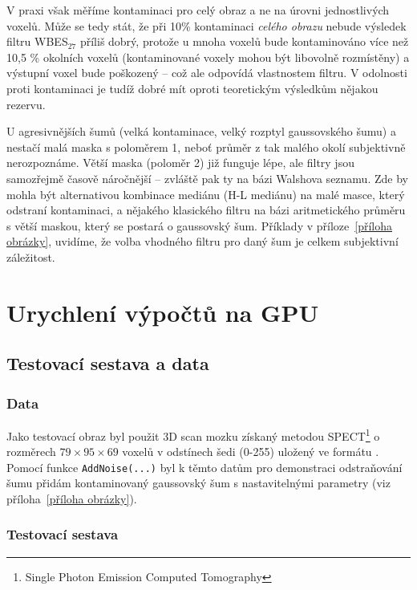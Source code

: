      \vspace{0.5cm}

     V praxi však měříme kontaminaci pro celý obraz a ne na úrovni jednostlivých voxelů. Může se tedy stát, že při 10\% kontaminaci \emph{celého obrazu} nebude výsledek filtru WBES$_{\mathrm{27}}$ příliš dobrý, protože u mnoha voxelů bude kontaminováno více než 10,5 \% okolních voxelů (kontaminované voxely mohou být libovolně rozmístěny) a výstupní voxel bude poškozený -- což ale odpovídá vlastnostem filtru. V odolnosti proti kontaminaci je tudíž dobré mít oproti teoretickým výsledkům nějakou rezervu.

     U agresivnějších šumů (velká kontaminace, velký rozptyl gaussovského šumu) a nestačí malá maska s poloměrem 1, neboť průměr z tak malého okolí subjektivně nerozpoznáme. Větší maska (poloměr 2) již funguje lépe, ale filtry jsou samozřejmě časově náročnější -- zvláště pak ty na bázi Walshova seznamu. Zde by mohla být alternativou kombinace mediánu (H-L mediánu) na malé masce, který odstraní kontaminaci, a nějakého klasického filtru na bázi aritmetického průměru s větší maskou, který se postará o gaussovský šum. Příklady v příloze~\ref{příloha obrázky}, uvidíme, že volba vhodného filtru pro daný šum je celkem subjektivní záležitost.

\section{Urychlení výpočtů na GPU}

    \subsection{Testovací sestava a data}

    \subsubsection{Data}

        Jako testovací obraz byl použit 3D scan mozku získaný metodou SPECT\footnote{Single Photon Emission Computed Tomography} o rozměrech $79 \times 95 \times 69$ voxelů v odstínech šedi (0-255) uložený ve formátu \Analyze. Pomocí funkce {\tt AddNoise(...)} byl k těmto datům pro demonstraci odstraňování šumu přidám kontaminovaný gaussovský šum s nastavitelnými parametry (viz příloha~\ref{příloha obrázky}).

    \subsubsection{Testovací sestava}


